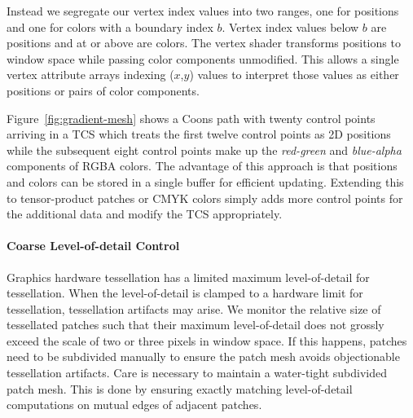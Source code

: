 Instead we segregate our vertex index values into two ranges, one for positions and one for colors with
a boundary index $b$.  Vertex index values below $b$ are positions and at or above are colors.  The vertex
shader transforms positions to window space while passing color components unmodified.  This allows
a single vertex attribute arrays indexing ($x$,$y$) values to interpret those values as either positions
or pairs of color components.  

Figure~\ref{fig:gradient-mesh} shows a Coons path with twenty control points
arriving in a TCS which treats the first twelve control points as 2D positions while the subsequent eight control
points make up the {\em red-green} and {\em blue-alpha} components of RGBA colors.  The advantage of this
approach is that positions and colors can be stored in a single buffer for efficient updating.  Extending
this to tensor-product patches or CMYK colors simply adds more control points for the additional data
and modify the TCS appropriately.
\fi

\paragraph{Coarse Level-of-detail Control}

Graphics hardware tessellation has a limited maximum level-of-detail for tessellation.  When the level-of-detail
is clamped to a hardware limit for tessellation, tessellation artifacts may arise.  We monitor the relative
size of tessellated patches such that their maximum level-of-detail does not grossly exceed the scale of two or three pixels
in window space.  If this happens, patches need to be subdivided manually to ensure the patch mesh
avoids objectionable tessellation artifacts.  Care is necessary to maintain a water-tight subdivided patch mesh.  This is done by ensuring exactly matching level-of-detail computations on mutual edges of adjacent patches.



 
